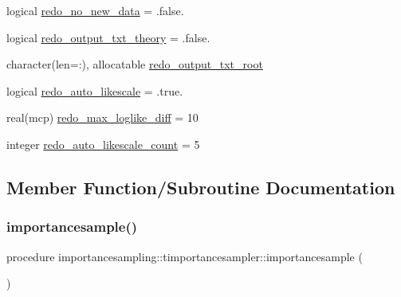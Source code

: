 \begin{DoxyCompactItemize}
\item 
logical \mbox{\hyperlink{structimportancesampling_1_1timportancesampler_ae178262e62748517e5b64847c50df630}{redo\+\_\+no\+\_\+new\+\_\+data}} = .false.
\item 
logical \mbox{\hyperlink{structimportancesampling_1_1timportancesampler_a6ae991a6cc8d7f31c4b64731974d7b8c}{redo\+\_\+output\+\_\+txt\+\_\+theory}} = .false.
\item 
character(len=\+:), allocatable \mbox{\hyperlink{structimportancesampling_1_1timportancesampler_add80ef01d2ac594972b745d44295af29}{redo\+\_\+output\+\_\+txt\+\_\+root}}
\item 
logical \mbox{\hyperlink{structimportancesampling_1_1timportancesampler_a41d971e7484129bb82f98ce539b1dc6f}{redo\+\_\+auto\+\_\+likescale}} = .true.
\item 
real(mcp) \mbox{\hyperlink{structimportancesampling_1_1timportancesampler_a5e9411d5c2505f056138b147c55ef614}{redo\+\_\+max\+\_\+loglike\+\_\+diff}} = 10
\item 
integer \mbox{\hyperlink{structimportancesampling_1_1timportancesampler_a414e2e311d3a02982a89d75c0aed173a}{redo\+\_\+auto\+\_\+likescale\+\_\+count}} = 5
\end{DoxyCompactItemize}


\subsection{Member Function/\+Subroutine Documentation}
\mbox{\label{structimportancesampling_1_1timportancesampler_aa53cd8f18fcfcca8033c75840ec6cba6}} 
\subsubsection{\texorpdfstring{importancesample()}{importancesample()}}
{\footnotesize\ttfamily procedure importancesampling\+::timportancesampler\+::importancesample (\begin{DoxyParamCaption}{ }\end{DoxyParamCaption})\hspace{0.3cm}{\ttfamily [private]}}

\mbox{\label{structimportancesampling_1_1timportancesampler_a75f7f0a6088d1c1038abb066339625fb}} 
